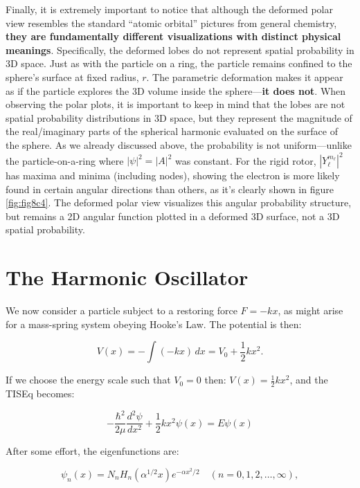 \documentclass[
  english,
  9pt,
]{extbook}
\theoremstyle{definition}
\theoremstyle{definition}
\theoremstyle{definition}
\theoremstyle{definition}
\theoremstyle{remark}
\begin{document}
Finally, it is extremely important to notice that although the deformed polar view resembles the standard ``atomic orbital'' pictures from general chemistry, \textbf{they are fundamentally different visualizations with distinct physical meanings}. Specifically, the deformed lobes do not represent spatial probability in 3D space. Just as with the particle on a ring, the particle remains confined to the sphere's surface at fixed radius, \(r\). The parametric deformation makes it appear as if the particle explores the 3D volume inside the sphere---\textbf{it does not}. When observing the polar plots, it is important to keep in mind that the lobes are not spatial probability distributions in 3D space, but they represent the magnitude of the real/imaginary parts of the spherical harmonic evaluated on the surface of the sphere. As we already discussed above, the probability is not uniform---unlike the particle-on-a-ring where \(|\psi|^2 = |A|^2\) was constant. For the rigid rotor, \(|Y_\ell^{m_\ell}|^2\) has maxima and minima (including nodes), showing the electron is more likely found in certain angular directions than others, as it's clearly shown in figure \ref{fig:fig8c4}. The deformed polar view visualizes this angular probability structure, but remains a 2D angular function plotted in a deformed 3D surface, not a 3D spatial probability.

\section{The Harmonic Oscillator}\label{the-harmonic-oscillator}

We now consider a particle subject to a restoring force \(F = -kx\), as might arise for a mass-spring system obeying Hooke's Law. The potential is then:

\begin{equation}
V(x) = - \int (-kx)\, dx = V_0 + \frac{1}{2} kx^2.
\label{eq:HO1}
\end{equation}

If we choose the energy scale such that \(V_0 = 0\) then: \(V(x) = \frac{1}{2}kx^2\), and the TISEq becomes:

\begin{equation}
- \frac{\hbar^2}{2 \mu} \frac{d^2\psi}{dx^2} + \frac{1}{2} kx^2 \psi(x) =
E \psi(x)
\label{eq:HO2}
\end{equation}

After some effort, the eigenfunctions are:

\begin{equation}
\psi_n(x) = N_{n} H_{n}(\alpha^{1/2} x) e^{-\alpha x^2 / 2} \quad (n=0,1,2,\ldots,\infty),
\label{eq:HO3}
\end{equation}
\end{document}
